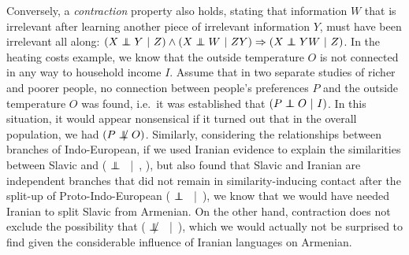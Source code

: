 Conversely, a \textit{contraction} property also holds, stating that information $W$ that is irrelevant after learning another piece of irrelevant information $Y$, must have been irrelevant all along: $(X \independent Y\ |\ Z)  \wedge (X \independent W\ |\ ZY) \Rightarrow (X \independent YW\ |\ Z)$. In the heating costs example, we know that the outside temperature $O$ is not connected in any way to household income $I$. Assume that in two separate studies of richer and poorer people, no connection between people's preferences $P$ and the outside temperature $O$ was found, i.e.\ it was established that $(P \independent O\ |\ I)$. In this situation, it would appear nonsensical if it turned out that in the overall population, we had $(P \notindep O)$. Similarly, considering the relationships between branches of Indo-European, if we used Iranian evidence to explain the similarities between Slavic and  ( $\independent$ \ |\ , ), but also found that Slavic and Iranian are independent branches that did not remain in similarity-inducing contact after the split-up of Proto-Indo-European ( $\independent$ \ |\ ), we know that we would have needed Iranian to split Slavic from Armenian. On the other hand, contraction does not exclude the possibility that ( $\notindep$ \ |\ ), which we would actually not be surprised to find given the considerable influence of Iranian languages on Armenian.

